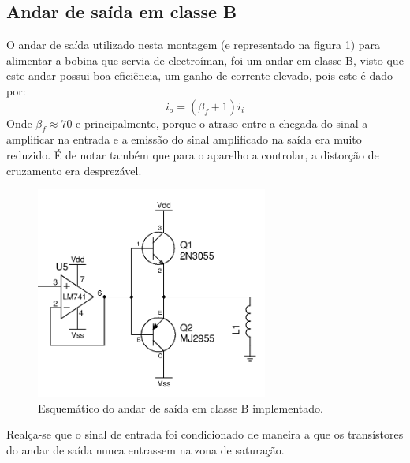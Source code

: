 \documentclass[%
  reprint,
  nofootinbib,
  amsmath,amssymb,
  aps,
  10pt,
  a4paper
]{revtex4-1}
\begin{document}
\subsection{Andar de saída em classe B}
O andar de saída utilizado nesta montagem (e representado na figura \ref{fig:B_team}) para alimentar a bobina que servia de electroíman, foi um andar em classe B, visto que este andar possui boa eficiência, um ganho de corrente elevado, pois este é dado por:
\begin{equation}
i_o=(\beta_f+1)i_i
\end{equation}
Onde $\beta_f\approx70$ e principalmente, porque o atraso entre a chegada do sinal a amplificar na entrada e a emissão do sinal amplificado na saída era muito reduzido. É de notar também que para o aparelho a controlar, a distorção de cruzamento era desprezável.
\begin{figure}[h]
\includegraphics[width=3in]{../img/andardesaida.png}
\caption{Esquemático do andar de saída em classe B implementado.}
\label{fig:B_team}
\end{figure}
Realça-se que o sinal de entrada foi condicionado de maneira a que os transístores do andar de saída nunca entrassem na zona de saturação.


\end{document}
